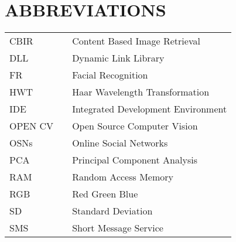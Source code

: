 \chapter*{ABBREVIATIONS}
\begin{tabular}{lll}

CBIR         &    \hspace{0.75in} 	&   Content Based Image Retrieval\\
DLL        &    \hspace{0.75in} 	&    Dynamic Link Library\\
FR        &    \hspace{0.75in} 	&    Facial Recognition \\ 
HWT         &    \hspace{0.75in} 	&    Haar Wavelength Transformation\\ 
IDE        &    \hspace{0.75in} 	&   Integrated Development Environment\\ 
OPEN CV         &    \hspace{0.75in} 	&    Open Source Computer Vision\\
OSNs         &    \hspace{0.75in} 	&    Online Social Networks\\
PCA        &    \hspace{0.75in} 	&   Principal Component Analysis  \\
RAM          &    \hspace{0.75in} 	&   Random Access Memory\\
RGB        &    \hspace{0.75in} 	&   Red Green Blue\\

  
SD         &    \hspace{0.75in} 	&   Standard Deviation\\     

   

SMS        &    \hspace{0.75in} 	&    Short Message Service\\ 
\end{tabular}